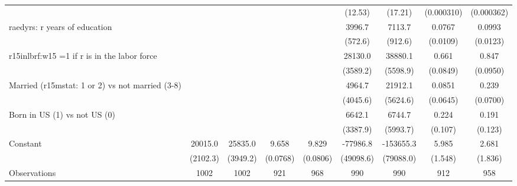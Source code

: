 \begin{table}[htbp]
\begin{tabular}{l*{8}{c}}
                &                  &                  &                  &                  &  (12.53)         &  (17.21)         &(0.000310)         &(0.000362)         \\
\addlinespace
raedyrs: r years of education&                  &                  &                  &                  &   3996.7\sym{***}&   7113.7\sym{***}&   0.0767\sym{***}&   0.0993\sym{***}\\
                &                  &                  &                  &                  &  (572.6)         &  (912.6)         & (0.0109)         & (0.0123)         \\
\addlinespace
r15inlbrf:w15 =1 if r is in the labor force&                  &                  &                  &                  &  28130.0\sym{***}&  38880.1\sym{***}&    0.661\sym{***}&    0.847\sym{***}\\
                &                  &                  &                  &                  & (3589.2)         & (5598.9)         & (0.0849)         & (0.0950)         \\
\addlinespace
Married (r15mstat: 1 or 2) vs not married (3-8)&                  &                  &                  &                  &   4964.7         &  21912.1\sym{***}&   0.0851         &    0.239\sym{***}\\
                &                  &                  &                  &                  & (4045.6)         & (5624.6)         & (0.0645)         & (0.0700)         \\
\addlinespace
Born in US (1) vs not US (0)&                  &                  &                  &                  &   6642.1\sym{*}  &   6744.7         &    0.224\sym{**} &    0.191         \\
                &                  &                  &                  &                  & (3387.9)         & (5993.7)         &  (0.107)         &  (0.123)         \\
\addlinespace
Constant        &  20015.0\sym{***}&  25835.0\sym{***}&    9.658\sym{***}&    9.829\sym{***}& -77986.8         &-153655.3\sym{*}  &    5.985\sym{***}&    2.681         \\
                & (2102.3)         & (3949.2)         & (0.0768)         & (0.0806)         &(49098.6)         &(79088.0)         &  (1.548)         &  (1.836)         \\
\midrule
Observations    &     1002         &     1002         &      921         &      968         &      990         &      990         &      912         &      958         \\

\end{tabular}
\end{table}
